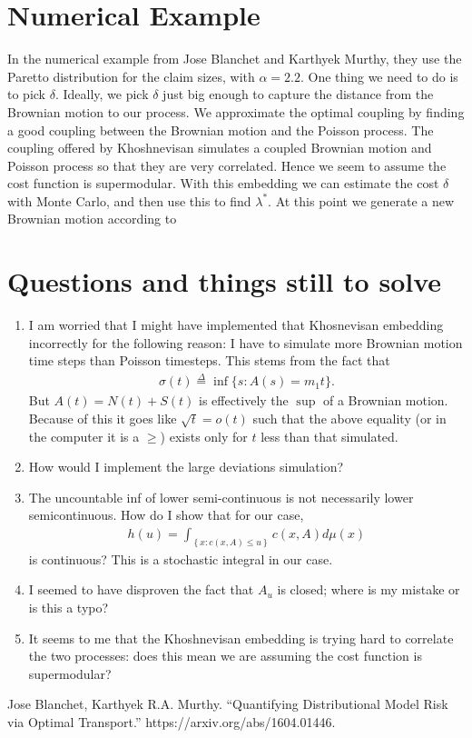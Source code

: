 \documentclass[12pt]{article}
\newcommand{\define}{\overset{\Delta}{=}}
\theoremstyle{definition}
\theoremstyle{definition}
\theoremstyle{definition}
\begin{document}
\section*{Numerical Example}
In the numerical example from Jose Blanchet and Karthyek Murthy, they use the Paretto distribution for the claim sizes, with $\alpha=2.2$. One thing we need to do is to pick $\delta$. Ideally, we pick $\delta$ just big enough to capture the distance from the Brownian motion to our process. We approximate the optimal coupling by finding a good coupling between the Brownian motion and the Poisson process. The coupling offered by Khoshnevisan simulates a coupled Brownian motion and Poisson process so that they are very correlated. Hence we seem to assume the cost function is supermodular. With this embedding we can estimate the cost $\delta$ with Monte Carlo, and then use this to find $\lambda^*$. At this point we generate a new Brownian motion according to 


\section*{Questions and things still to solve}
\begin{enumerate}
\item I am worried that I might have implemented that Khosnevisan embedding incorrectly for the following reason: I have to simulate more Brownian motion time steps than Poisson timesteps. This stems from the fact that 
\begin{align*}
\sigma(t)\define\inf\{s: A(s)=m_1t\}.
\end{align*}
But $A(t)=N(t)+S(t)$ is effectively the $\sup$ of a Brownian motion. Because of this it goes like $\sqrt{t}=o(t)$ such that the above equality (or in the computer it is a $\geq$) exists only for $t$ less than that simulated.

\item How would I implement the large deviations simulation?

\item The uncountable inf of lower semi-continuous is not necessarily lower semicontinuous. How do I show that for our case,
\begin{align*}
h(u)=\int_{\left\{x:c(x,A)\leq u\right\}}^{}c(x,A)d\mu(x)
\end{align*}
is continuous? This is a stochastic integral in our case.
\item  I seemed to have disproven the fact that $A_u$ is closed; where is my mistake or is this a typo?
\item It seems to me that the Khoshnevisan embedding is trying hard to correlate the two processes: does this mean we are assuming the cost function is supermodular?

\end{enumerate}

\begin{thebibliography}{9}
 Jose Blanchet, Karthyek R.A. Murthy. ``Quantifying Distributional Model Risk via Optimal Transport.'' https://arxiv.org/abs/1604.01446.
\end{thebibliography}
\end{document}
